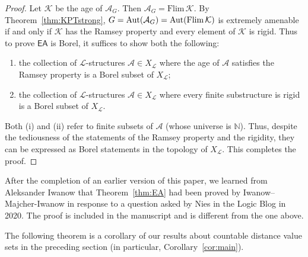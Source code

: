 \documentclass{amsart}
\theoremstyle{definition}
\theoremstyle{remark}
\begin{document}
\begin{proof}
Let $\mathcal{K}$ be the age of $\mathcal{A}_G$. Then $\mathcal{A}_G=\mbox{Flim}\,\mathcal{K}$. By Theorem~\ref{thm:KPTstrong}, $G=\mbox{\rm Aut}(\mathcal{A}_G)=\mbox{\rm Aut}(\mbox{Flim}\,\mathcal{K})$ is extremely amenable if and only if $\mathcal{K}$ has the Ramsey property and every element of $\mathcal{K}$ is rigid. Thus to prove $\mathsf{EA}$ is Borel, it suffices to show both the following:
\begin{enumerate}
\item[(i)] the collection of $\mathcal{L}$-structures $\mathcal{A}\in X_{\mathcal{L}}$ where the age of $\mathcal{A}$ satisfies the Ramsey property is a Borel subset of $X_{\mathcal{L}}$;
\item[(ii)] the collection of $\mathcal{L}$-structures $\mathcal{A}\in X_{\mathcal{L}}$ where every finite substructure is rigid is a Borel subset of $X_{\mathcal{L}}$.
\end{enumerate}

Both (i) and (ii) refer to finite subsets of $\mathcal{A}$ (whose universe is $\mathbb{N}$). Thus, despite the tediousness of the statements of the Ramsey property and the rigidity, they can be expressed as Borel statements in the topology of $X_{\mathcal{L}}$. This completes the proof.
     \end{proof}
     
 After the completion of an earlier version of this paper, we learned from Aleksander Iwanow that Theorem~\ref{thm:EA} had been proved by Iwanow--Majcher-Iwanow in response to a question asked by Nies in the Logic Blog in 2020. The proof is included in the manuscript \cite{Nies} and is different from the one above. 
     


The following theorem is a corollary of our results about countable distance value sets in the preceding section (in particular, Corollary~\ref{cor:main}).
\end{document}
